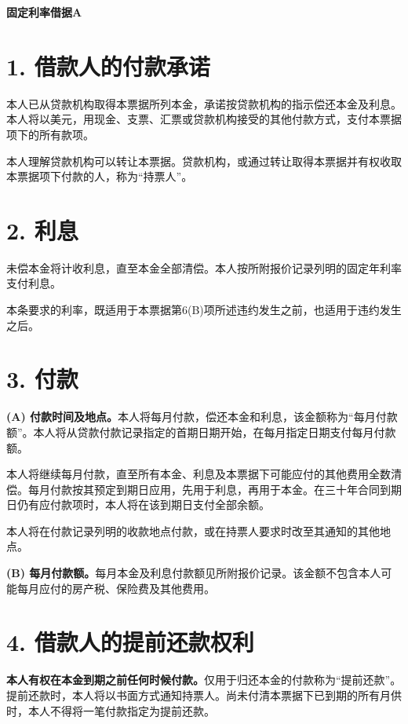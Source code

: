 \documentclass[UTF8,fontset=none,11pt,a4paper]{ctexart}
\begin{document}
{\noindent\fontsize{20}{25}\selectfont\bfseries 固定利率借据A\par}
\vspace{10pt}
\section*{1. 借款人的付款承诺}
本人已从贷款机构取得本票据所列本金，承诺按贷款机构的指示偿还本金及利息。本人将以美元，用现金、支票、汇票或贷款机构接受的其他付款方式，支付本票据项下的\allowbreak\mbox{所有款项。}


本人理解贷款机构可以转让本票据。贷款机构，或通过转让取得本票据并有权收取本票据项下付款的人，称为“持票人”。


\section*{2. 利息}
未偿本金将计收利息，直至本金全部清偿。本人按所附报价记录列明的固定年利率\allowbreak\mbox{支付利息。}


本条要求的利率，既适用于本票据第6(B)项所述违约发生之前，也适用于违约\allowbreak\mbox{发生之后。}


\section*{3. 付款}
\textbf{(A) 付款时间及地点。}本人将每月付款，偿还本金和利息，该金额称为“每月付款额”。本人将从贷款付款记录指定的首期日期开始，在每月指定日期支付每\allowbreak\mbox{月付款额。}


本人将继续每月付款，直至所有本金、利息及本票据下可能应付的其他费用全数清偿。每月付款按其预定到期日应用，先用于利息，再用于本金。在三十年合同到期日仍有应付款项时，本人将在该到期日支付\allowbreak\mbox{全部余额。}


本人将在付款记录列明的收款地点付款，或在持票人要求时改至其通知的\allowbreak\mbox{其他地点。}


\textbf{(B) 每月付款额。}每月本金及利息付款额见所附报价记录。该金额不包含本人可能每月应付的房产税、保险费及\allowbreak\mbox{其他费用。}


\section*{4. 借款人的提前还款权利}
\textbf{本人有权在本金到期之前任何时候付款。}仅用于归还本金的付款称为“提前还款”。提前还款时，本人将以书面方式通知持票人。尚未付清本票据下已到期的所有月供时，本人不得将一笔付款指定为\allowbreak\mbox{提前还款。}
\end{document}
